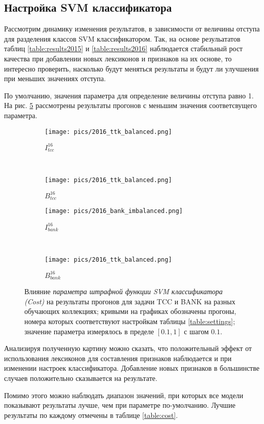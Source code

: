 \subsection{Настройка SVM классификатора}
Рассмотрим динамику изменения результатов, в зависимости от величины
отступа для разделения классов SVM классификатором.
Так, на основе резульататов таблиц \ref{table:results2015} и \ref{table:results2016}
наблюдается стабильный рост качества при добавлении новых лексиконов и признаков
на их основе, то интересно проверить, насколько будут меняться результаты и
будут ли улучшения при меньших значениях отступа.

По умолчанию, значения параметра для определение величины отступа равно 1.
На рис. \ref{fig:cost} рассмотрены результаты прогонов с меньшим значения
соответсвущего параметра.
\begin{figure}[!htop] \centering
    \begin{subfigure}[b]{0.34\textwidth}
        \texttt{[image: pics/2016\_ttk\_balanced.png]}
        \caption{$I_{tcc}^{16}$}
        \label{fig:tcc_cost_changes_2015}
    \end{subfigure}
    ~
    \begin{subfigure}[b]{0.34\textwidth}
        \texttt{[image: pics/2016\_ttk\_balanced.png]}
        \caption{$B_{tcc}^{16}$}
        \label{fig:tcc_cost_changes_2016}
    \end{subfigure}

    \begin{subfigure}[b]{0.34\textwidth}
        \texttt{[image: pics/2016\_bank\_imbalanced.png]}
        \caption{$I_{bank}^{16}$}
        \label{fig:bank_cost_changes_2016}
    \end{subfigure}
    ~
    \begin{subfigure}[b]{0.34\textwidth}
        \texttt{[image: pics/2016\_ttk\_balanced.png]}
        \caption{$B_{bank}^{16}$}
        \label{fig:bank_cost_changes_2015}
    \end{subfigure}

    \caption{
        Влияние {\it параметра штрафной функции SVM классификатора (Cost)}
        на результаты прогонов для задачи TCC и BANK на разных обучающих
        коллекциях;
        кривыми на графиках обозначены прогоны, номера которых соответствуют
        настройкам таблицы \ref{table:settings};
        значение параметра измерялось в пределе $[0.1, 1]$ с шагом $0.1$.
    }
    \label{fig:cost}
\end{figure}

Анализируя полученную картину можно сказать, что положительный эффект от
использования лексиконов для составления признаков наблюдается и при
изменении настроек классификатора.
Добавление новых признаков в большинстве случаев положительно сказывается на
результате.

Помимо этого можно наблюдать диапазон значений, при которых все модели
показывают результаты лучше, чем при параметре по-умолчанию.
Лучшие результаты по каждому отмечены в таблице \ref{table:cost}.


